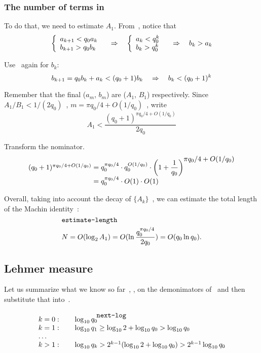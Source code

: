 \documentclass[draft, 11pt]{article} %
\begin{document}
\subsubsection{The number of terms in~}

To do that, we need to estimate $A_1$.
From~, notice that
$$
\left\{ \begin{array}{l}
a_{k+1} < q_0 a_k \\
b_{k+1} > q_0 b_k
\end{array} \right.
    \quad\Rightarrow\quad
\left\{ \begin{array}{l}
a_k < q_0^k \\
b_k > q_0^k
\end{array} \right.
    \quad\Rightarrow\quad
b_k > a_k
$$

Use~ again for $b_k$:
$$
b_{k+1} = q_0 b_k + a_k < (q_0 + 1) b_k
    \quad\Rightarrow\quad b_k < (q_0 + 1)^k
$$

Remember that the final ($a_m$, $b_m$) are ($A_1$, $B_1$) respectively.
Since $A_1 / B_1 < 1 / (2 q_0)$~,
$m = \pi q_0 / 4 + O(1/q_0)$~, write
$$
A_1 < \dfrac{(q_0+1)^{\pi q_0 / 4 + O(1/q_0)}}{2 q_0} 
$$

Transform the nominator.
$$
\begin{array}{l}
(q_0+1)^{\pi q_0 / 4 + O(1/q_0)} = 
    q_0^{\pi q_0 / 4} \cdot q_0^{O(1/q_0)} \cdot
        \left( 1+\dfrac{1}{q_0} \right)^{\ds \pi q_0 / 4 + O(1/q_0)} \\
\phantom{(q_0+1)^{\pi q_0 / 4 + O(1/q_0)}} = q_0^{\pi q_0 / 4} \cdot O(1) \cdot O(1)
\end{array}
$$

Overall, taking into account the decay of $\{ A_k \}$~, we can
estimate the total length of the Machin identity~:
%
\begin{equation}\mlabel{estimate-length}
N = O(\log_2 A_1) = O(\ln \dfrac{ q_0^{\pi q_0 / 4} }{2 q_0}) = O(q_0 \ln q_0).
\end{equation}

\subsection{Lehmer measure}

Let us summarize what we know so far~,
, on the demonimators of~
and then substitute that into~.
\begin{equation}\mlabel{next-log}\vcenter{\hbox to 10em{\hss\vbox{
\begin{center}
\begin{tabular}{ l l }
$k=0:\quad$ & $\lg q_0$ \\
$k=1:$ & $\lg q_1 \ge \lg 2 + \lg q_0 > \lg q_0$ \\
$\dots$ \\
$k>1:$ & $\lg q_k > 2^{k-1} (\lg 2 + \lg q_0) > 2^{k-1} \lg q_0$ \\
\end{tabular}
\end{center}%
}\hss}}\end{equation}
\end{document}
